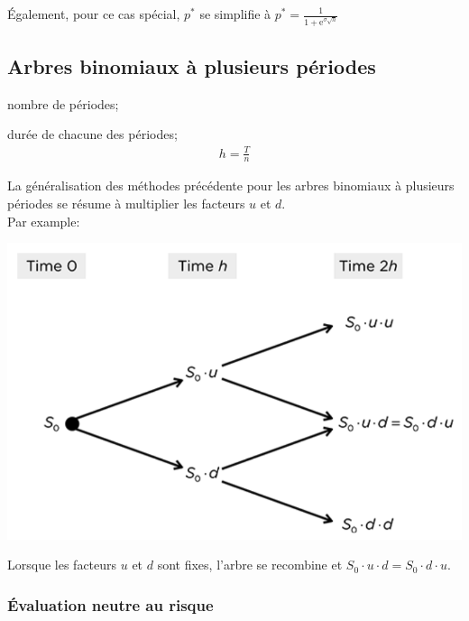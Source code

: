 \documentclass[10pt, french]{article}
\begin{document}
\begin{multicols*}{2}
Également, pour ce cas spécial, $p^{*}$ se simplifie à $p^{*}	=	\frac{1}{1 + \textrm{e}^{\sigma \sqrt{h}}}$

\subsection*{Arbres binomiaux à plusieurs périodes}

\begin{distributions}[Notation]
\begin{description}[leftmargin = *]
	\item[$n$]	nombre de périodes;
	\item[$h$]	durée de chacune des périodes;
		\begin{align*}
		h	=	\frac{T}{n}
		\end{align*}
\end{description}
\end{distributions}

La généralisation des méthodes précédente pour les arbres binomiaux à plusieurs périodes se résume à multiplier les facteurs $u$ et $d$. \\
Par example:
\begin{center}
	\includegraphics[scale=0.33]{src/ACT-2011/mult-per-bin-tree.png}
\end{center}

Lorsque les facteurs $u$ et $d$ sont fixes, l'arbre se recombine et $S_{0} \cdot u \cdot d = S_{0} \cdot d \cdot u$.

\subsubsection*{Évaluation neutre au risque}


\end{multicols*}
\end{document}
